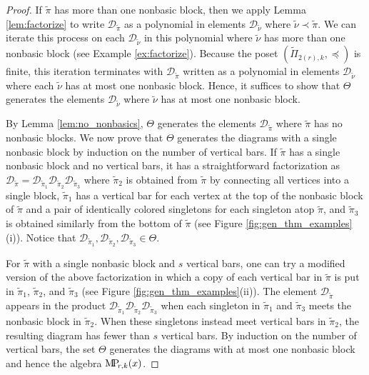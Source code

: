 \documentclass[ALCO,Unicode,published]{cedram}
\newcommand{\DD}{\mathcal{D}}
\newcommand{\MP}{{\rm M\!P\!}}
\newcommand{\tpi}{{\tilde{\pi}}}
\newcommand{\tnu}{{\tilde{\nu}}}
\begin{document}
\begin{proof}
    If $\tpi$ has more than one nonbasic block, then we apply Lemma \ref{lem:factorize} to write $\DD_\tpi$ as a polynomial in elements $\DD_\tnu$ where $\tnu\prec\tpi$. We can iterate this process on each $\DD_\tnu$ in this polynomial where $\tnu$ has more than one nonbasic block (see Example \ref{ex:factorize}). Because the poset $(\tilde\Pi_{2(r),k},\preceq)$ is finite, this iteration terminates with $\DD_\tpi$ written as a polynomial in elements $\DD_\tnu$ where each $\tnu$ has at most one nonbasic block. Hence, it suffices to show that $\Theta$ generates the elements $\DD_\tnu$ where $\tnu$ has at most one nonbasic block.

    By Lemma \ref{lem:no_nonbasics}, $\Theta$ generates the elements $\DD_\tpi$ where $\tpi$ has no nonbasic blocks. We now prove that $\Theta$ generates the diagrams with a single nonbasic block by induction on the number of vertical bars. If $\tpi$ has a single nonbasic block and no vertical bars, it has a straightforward factorization as $\DD_\tpi=\DD_{\tpi_1}\DD_{\tpi_2}\DD_{\tpi_3}$ where $\tpi_2$ is obtained from $\tpi$ by connecting all vertices into a single block, $\tpi_1$ has a vertical bar for each vertex at the top of the nonbasic block of $\tpi$ and a pair of identically colored singletons for each singleton atop $\tpi$, and $\tpi_3$ is obtained similarly from the bottom of $\tpi$ (see Figure \ref{fig:gen_thm_examples}(i)). Notice that $\DD_{\tpi_1},\DD_{\tpi_2},\DD_{\tpi_3}\in\Theta$.

    For $\tpi$ with a single nonbasic block and $s$ vertical bars, one can try a modified version of the above factorization in which a copy of each vertical bar in $\tpi$ is put in $\tpi_1$, $\tpi_2$, and $\tpi_3$ (see Figure \ref{fig:gen_thm_examples}(ii)). The element $\DD_\tpi$ appears in the product $\DD_{\tpi_1}\DD_{\tpi_2}\DD_{\tpi_3}$ when each singleton in $\tpi_1$ and $\tpi_3$ meets the nonbasic block in $\tpi_2$. When these singletons instead meet vertical bars in $\tpi_2$, the resulting diagram has fewer than $s$ vertical bars. By induction on the number of vertical bars, the set $\Theta$ generates the diagrams with at most one nonbasic block and hence the algebra $\MP_{r,k}(x)$.
\end{proof}
\end{document}
